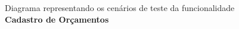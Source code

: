             \begin{figure}[!htb]
                \centering
	            \begin{minipage}{\wd0}
		            \caption{Diagrama representando os cenários de teste da funcionalidade \textbf{Cadastro de Orçamentos}}
		            \label{fig:testing-mind-map-orcamentos-cadastro}
	            \end{minipage}
            \end{figure}

